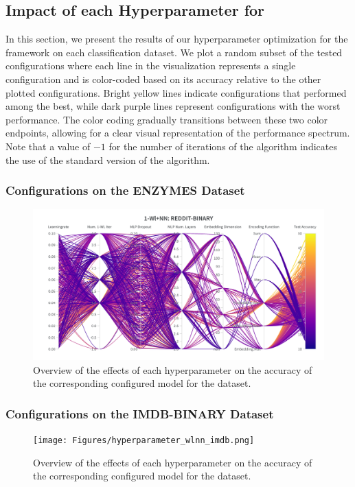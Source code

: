 \subsection{Impact of each Hyperparameter for \wlnn}
In this section, we present the results of our hyperparameter optimization for the \wlnn framework on each classification dataset. We plot a random subset of the tested configurations where each line in the visualization represents a single configuration and is color-coded based on its accuracy relative to the other plotted configurations. Bright yellow lines indicate configurations that performed among the best, while dark purple lines represent configurations with the worst performance. The color coding gradually transitions between these two color endpoints, allowing for a clear visual representation of the performance spectrum. Note that a value of $-1$ for the number of iterations of the \wl algorithm indicates the use of the standard version of the algorithm.

\subsubsection{\wlnn Configurations on the ENZYMES Dataset}
\begin{figure}[H]
    \centering
    \includegraphics[width=\textwidth, trim={0 75 0 150}, clip]{Figures/hyperparameter_wlnn_enzymes.png}
    \caption{Overview of the effects of each hyperparameter on the accuracy of the corresponding configured \wlnn model for the \enzymes dataset.}
    \label{fig:wandb_wlnn_enzymes}
\end{figure}

\subsubsection{\wlnn Configurations on the IMDB-BINARY Dataset}
\begin{figure}[H]
    \centering
    \texttt{[image: Figures/hyperparameter\_wlnn\_imdb.png]}
    \caption{Overview of the effects of each hyperparameter on the accuracy of the corresponding configured \wlnn model for the \imdb dataset.}
    \label{fig:wandb_wlnn_imdb}
\end{figure}
\clearpage

